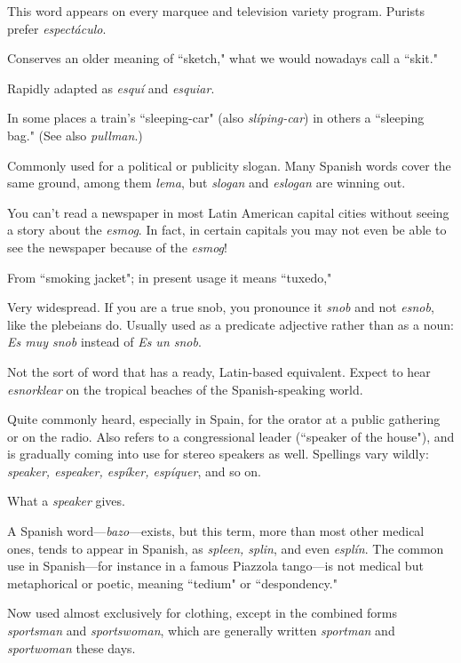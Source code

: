  This word appears on every marquee and television
variety program. Purists prefer \emph{espectáculo}.

 Conserves an older meaning of ``sketch," what we
would nowadays call a ``skit."

 Rapidly adapted as \emph{esquí} and \emph{esquiar}.

 In some places a train's ``sleeping-car" (also
\emph{slíping-car}) in others a ``sleeping bag." (See also \emph{pullman}.)

 Commonly used for a political or publicity slogan.
Many Spanish words cover the same ground, among them \emph{lema}, but
\emph{slogan} and \emph{eslogan} are winning out.

 You can't read a newspaper in most Latin American
capital cities without seeing a story about the \emph{esmog}. In fact, in certain capitals you may not even be able to see the newspaper because
of the \emph{esmog}!

 From ``smoking jacket"; in present usage it means
``tuxedo,"

 Very widespread. If you are a true snob, you pronounce
it \emph{snob} and not \emph{esnob}, like the plebeians do. Usually used as a predicate
adjective rather than as a noun: \emph{Es muy snob} instead of \emph{Es un snob}.

 Not the sort of word that has a ready, Latin-based
equivalent. Expect to hear \emph{esnorklear} on the tropical beaches of the
Spanish-speaking world.

 Quite commonly heard, especially in Spain, for
the orator at a public gathering or on the radio. Also refers to a congressional leader (``speaker of the house"), and is gradually coming
into use for stereo speakers as well. Spellings vary wildly: \emph{speaker,
espeaker, espíker, espíquer}, and so on.

 What a \emph{speaker} gives.

 A Spanish word---\emph{bazo}---exists, but this term, more
than most other medical ones, tends to appear in Spanish, as \emph{spleen,
splin}, and even \emph{esplín}. The common use in Spanish---for instance in
a famous Piazzola tango---is not medical but metaphorical or poetic,
meaning ``tedium" or ``despondency."

 Now used almost exclusively for clothing, except in
the combined forms \emph{sportsman} and \emph{sportswoman}, which are generally
written \emph{sportman} and \emph{sportwoman} these days.


